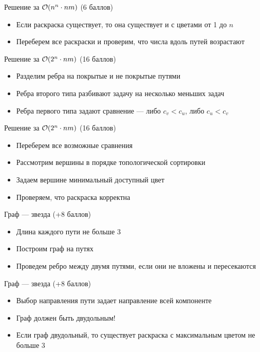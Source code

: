 \begin{frame}{Решение за $\mathcal{O}(n^n \cdot nm)$ (6 баллов)}
  \begin{itemize}
  \item Если раскраска существует, то она существует и с цветами от 1 до $n$
  \item Переберем все раскраски и проверим, что числа вдоль путей возрастают
  \end{itemize}
\end{frame}
\begin{frame}{Решение за $\mathcal{O}(2^n \cdot nm)$ (16 баллов)}
  \begin{itemize}
  \item Разделим ребра на покрытые и не покрытые путями
  \item Ребра второго типа разбивают задачу на несколько меньших задач
  \item Ребра первого типа задают сравнение --- либо $c_v < c_u$, либо $c_u < c_v$
  \end{itemize}
\end{frame}
\begin{frame}{Решение за $\mathcal{O}(2^n \cdot nm)$ (16 баллов)}
  \begin{itemize}
  \item Переберем все возможные сравнения
  \item Рассмотрим вершины в порядке топологической сортировки
  \item Задаем вершине минимальный доступный цвет
  \item Проверяем, что раскраска корректна
  \end{itemize}
\end{frame}

\begin{frame}{Граф --- звезда (+8 баллов)}
  \begin{itemize}
  \item Длина каждого пути не больше 3
  \item Построим граф на путях
  \item Проведем ребро между двумя путями, если они не вложены и пересекаются
  \end{itemize}
\end{frame}

\begin{frame}{Граф --- звезда (+8 баллов)}
  \begin{itemize}
  \item Выбор направления пути задает направление всей компоненте
  \item Граф должен быть двудольным!
  \item Если граф двудольный, то существует раскраска с максимальным цветом не больше 3
  \end{itemize}
\end{frame}

